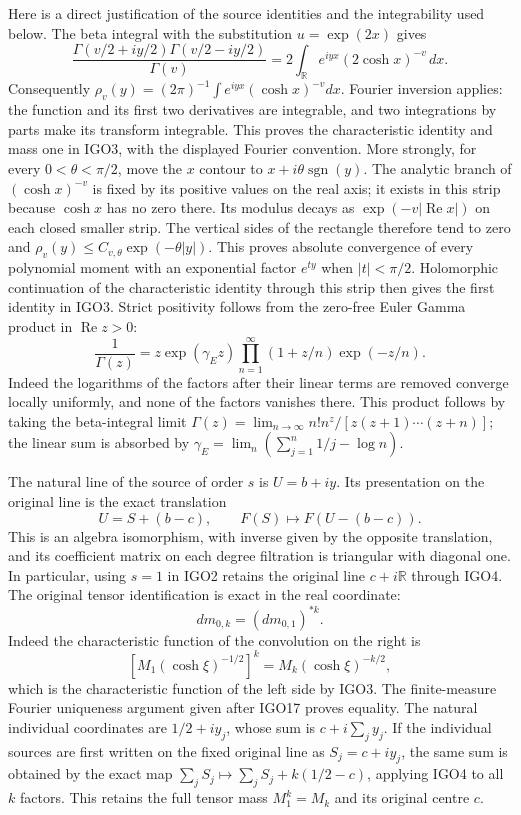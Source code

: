 \documentclass[11pt,a4paper]{article}
\begin{document}
Here is a direct justification of the source identities and the
integrability used below. The beta integral with the substitution
$u=\exp(2x)$ gives
\[
 \frac{\Gamma(v/2+iy/2)\Gamma(v/2-iy/2)}{\Gamma(v)}
  =2\int_{\mathbb R} e^{iyx}(2\cosh x)^{-v}\,dx.
\]
Consequently $\rho_v(y)=(2\pi)^{-1}
\int e^{iyx}(\cosh x)^{-v}dx$. Fourier inversion applies: the
function and its first two derivatives are integrable, and two
integrations by parts make its transform integrable. This proves
the characteristic identity and mass one in IGO3, with the displayed
Fourier convention. More strongly, for every $0<\theta<\pi/2$, move
the $x$ contour to $x+i\theta\operatorname{sgn}(y)$. The analytic
branch of $(\cosh x)^{-v}$ is fixed by its positive values on the
real axis; it exists in this strip because $\cosh x$ has no zero
there. Its modulus decays as $\exp(-v|\operatorname{Re}x|)$ on
each closed smaller strip. The vertical sides of the rectangle
therefore tend to zero and
$\rho_v(y)\leq C_{v,\theta}\exp(-\theta|y|)$.
This proves absolute convergence of every polynomial moment with
an exponential factor $e^{ty}$ when $|t|<\pi/2$. Holomorphic
continuation of the characteristic identity through this strip
then gives the first identity in IGO3. Strict positivity follows
from the zero-free Euler Gamma product in $\operatorname{Re}z>0$:
\[
 \frac1{\Gamma(z)}=z\exp(\gamma_{\!E}z)
       \prod_{n=1}^{\infty}(1+z/n)\exp(-z/n).
\]
Indeed the logarithms of the factors after their linear terms are
removed converge locally uniformly, and none of the factors vanishes
there. This product follows by taking the beta-integral limit
$\Gamma(z)=\lim_{n\to\infty}n!n^z/[z(z+1)\cdots(z+n)]$;
the linear sum is absorbed by
$\gamma_{\!E}=\lim_n(\sum_{j=1}^n1/j-\log n)$.

The natural line of the source of order $s$ is $U=b+iy$.
Its presentation on the original line is the exact translation
\[
 U=S+(b-c),\qquad
 F(S)\longmapsto F(U-(b-c)).
 \tag{IGO4}
\]
This is an algebra isomorphism, with inverse given by the opposite
translation, and its coefficient matrix on each degree filtration
is triangular with diagonal one. In particular, using $s=1$ in
IGO2 retains the original line $c+i\mathbb R$ through IGO4.
The original tensor identification is exact in the real coordinate:
\[
 dm_{0,k}=(dm_{0,1})^{*k}.
\]
Indeed the characteristic function of the convolution on the right
is \[[M_1(\cosh\xi)^{-1/2}]^k
=M_k(\cosh\xi)^{-k/2},\] which is the characteristic function
of the left side by IGO3. The finite-measure Fourier uniqueness
argument given after IGO17 proves equality. The natural individual
coordinates are $1/2+iy_j$, whose sum is $c+i\sum_jy_j$.
If the individual sources are first written on the fixed original
line as $S_j=c+iy_j$, the same sum is obtained by the exact map
$\sum_jS_j\mapsto\sum_jS_j+k(1/2-c)$, applying IGO4 to all
$k$ factors. This retains the full tensor mass $M_1^k=M_k$
and its original centre $c$.
\end{document}
